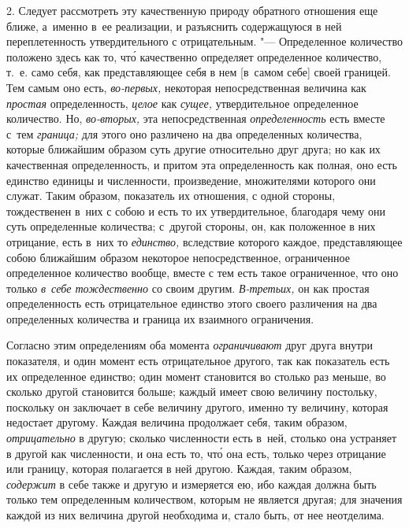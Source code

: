 2. Следует рассмотреть эту качественную природу обратного отношения еще ближе,
а~именно в~ее реализации, и разъяснить содержащуюся в ней переплетенность
утвердительного с отрицательным. "--- Определенное количество положено здесь
как то, чт\'{о} качественно определяет определенное количество, т.~е. само
себя, как представляющее себя в нем [в~самом себе] своей границей. Тем самым
оно есть, {\em во-первых,} некоторая непосредственная величина как
{\em простая} определенность, {\em целое} как {\em сущее,} утвердительное
определенное количество. Но, {\em во-вторых,} эта непосредственная
{\em определенность} есть вместе с~тем {\em граница;} для этого оно различено
на два определенных количества, которые ближайшим образом суть другие
относительно друг друга; но как их качественная определенность, и притом эта
определенность как полная, оно есть единство единицы и численности,
произведение, множителями которого они служат. Таким образом, показатель их
отношения, с одной стороны, тождественен в~них с собою и есть то их
утвердительное, благодаря чему они суть определенные количества; с~другой
стороны, он, как положенное в них отрицание, есть в~них то {\em единство,}
вследствие которого каждое, представляющее собою ближайшим образом некоторое
непосредственное, ограниченное определенное количество вообще, вместе с тем
есть такое ограниченное, что оно только {\em в~себе тождественно} со своим
другим. {\em В-третьих,} он как простая определенность есть отрицательное
единство этого своего различения на два определенных количества и граница их
взаимного ограничения.

Согласно этим определениям оба момента {\em ограничивают} друг друга внутри
показателя, и один момент есть отрицательное другого, так как показатель есть
их определенное единство; один момент становится во столько раз меньше, во
сколько другой становится больше; каждый имеет свою величину постольку,
поскольку он заключает в себе величину другого, именно ту величину, которая
недостает другому. Каждая величина продолжает себя, таким образом,
{\em отрицательно} в другую; сколько численности есть в~ней, столько она
устраняет в другой как численности, и она есть то, чт\'{о} она есть, только
через отрицание или границу, которая полагается в ней другою. Каждая, таким
образом, {\em содержит} в себе также и другую и измеряется ею, ибо каждая
должна быть только тем определенным количеством, которым не является другая;
для значения каждой из них величина другой необходима и, стало быть, от нее
неотделима.

